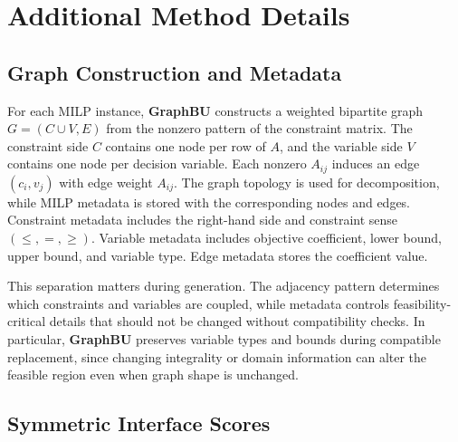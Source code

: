 \documentclass[letterpaper]{article}
\newcommand{\method}{\textbf{GraphBU}\xspace}
\begin{document}


\appendix
\clearpage
\begingroup
\setlength{\textfloatsep}{7pt plus 1pt minus 2pt}
\setlength{\floatsep}{6pt plus 1pt minus 2pt}
\setlength{\intextsep}{6pt plus 1pt minus 2pt}
\captionsetup[table]{skip=3pt}
\makeatletter
\setlength{\@fptop}{0pt}
\setlength{\@fpsep}{8pt plus 1pt minus 1pt}
\setlength{\@fpbot}{0pt plus 1fil}
\setlength{\@dblfptop}{0pt}
\setlength{\@dblfpsep}{8pt plus 1pt minus 1pt}
\setlength{\@dblfpbot}{0pt plus 1fil}
\makeatother

\section{Additional Method Details}

\subsection{Graph Construction and Metadata}

For each MILP instance, \method constructs a weighted bipartite graph
$G=(C\cup V,E)$ from the nonzero pattern of the constraint matrix. The
constraint side $C$ contains one node per row of $A$, and the variable
side $V$ contains one node per decision variable. Each nonzero
$A_{ij}$ induces an edge $(c_i,v_j)$ with edge weight $A_{ij}$.
The graph topology is used for decomposition, while MILP metadata is
stored with the corresponding nodes and edges. Constraint metadata
includes the right-hand side and constraint sense
$(\le,=,\ge)$. Variable metadata includes objective coefficient, lower
bound, upper bound, and variable type. Edge metadata stores the
coefficient value.

This separation matters during generation. The adjacency pattern
determines which constraints and variables are coupled, while metadata
controls feasibility-critical details that should not be changed
without compatibility checks. In particular, \method preserves variable types and
bounds during compatible replacement, since changing integrality or
domain information can alter the feasible region even when graph shape
is unchanged.

\subsection{Symmetric Interface Scores}
\end{document}

